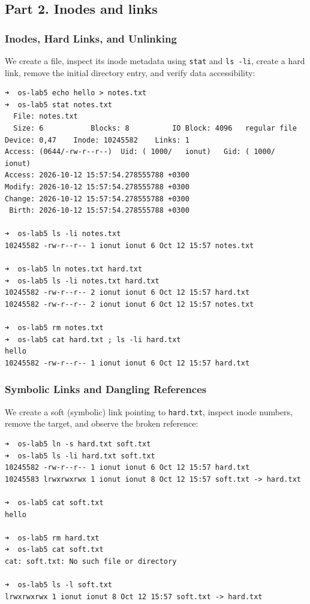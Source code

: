 \documentclass{labreport}
\begin{document}
\subsection{Part 2. Inodes and links}

\subsubsection{Inodes, Hard Links, and Unlinking}
We create a file, inspect its inode metadata using \texttt{stat} and \texttt{ls -li}, create a hard link, remove the initial directory entry, and verify data accessibility:

\begin{lstlisting}[style=bash]
➜  os-lab5 echo hello > notes.txt
➜  os-lab5 stat notes.txt
  File: notes.txt
  Size: 6         	Blocks: 8          IO Block: 4096   regular file
Device: 0,47	Inode: 10245582    Links: 1
Access: (0644/-rw-r--r--)  Uid: ( 1000/   ionut)   Gid: ( 1000/   ionut)
Access: 2026-10-12 15:57:54.278555788 +0300
Modify: 2026-10-12 15:57:54.278555788 +0300
Change: 2026-10-12 15:57:54.278555788 +0300
 Birth: 2026-10-12 15:57:54.278555788 +0300

➜  os-lab5 ls -li notes.txt
10245582 -rw-r--r-- 1 ionut ionut 6 Oct 12 15:57 notes.txt

➜  os-lab5 ln notes.txt hard.txt
➜  os-lab5 ls -li notes.txt hard.txt
10245582 -rw-r--r-- 2 ionut ionut 6 Oct 12 15:57 hard.txt
10245582 -rw-r--r-- 2 ionut ionut 6 Oct 12 15:57 notes.txt

➜  os-lab5 rm notes.txt
➜  os-lab5 cat hard.txt ; ls -li hard.txt
hello
10245582 -rw-r--r-- 1 ionut ionut 6 Oct 12 15:57 hard.txt
\end{lstlisting}

\subsubsection{Symbolic Links and Dangling References}
We create a soft (symbolic) link pointing to \texttt{hard.txt}, inspect inode numbers, remove the target, and observe the broken reference:

\begin{lstlisting}[style=bash]
➜  os-lab5 ln -s hard.txt soft.txt
➜  os-lab5 ls -li hard.txt soft.txt
10245582 -rw-r--r-- 1 ionut ionut 6 Oct 12 15:57 hard.txt
10245583 lrwxrwxrwx 1 ionut ionut 8 Oct 12 15:57 soft.txt -> hard.txt

➜  os-lab5 cat soft.txt
hello

➜  os-lab5 rm hard.txt
➜  os-lab5 cat soft.txt
cat: soft.txt: No such file or directory

➜  os-lab5 ls -l soft.txt
lrwxrwxrwx 1 ionut ionut 8 Oct 12 15:57 soft.txt -> hard.txt
\end{lstlisting}
\end{document}
